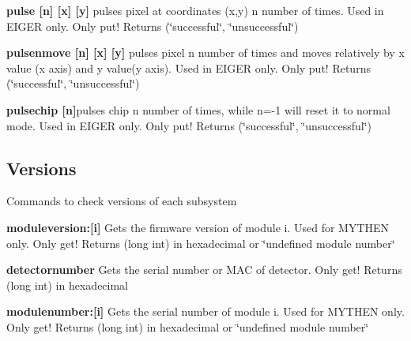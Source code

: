 \begin{DoxyItemize}
\item {\bfseries pulse \mbox{[}n\mbox{]} \mbox{[}x\mbox{]} \mbox{[}y\mbox{]}} pulses pixel at coordinates (x,y) n number of times. Used in EIGER only. Only put! {\ttfamily Returns} {\ttfamily }(\char`\"{}successful\char`\"{}, \char`\"{}unsuccessful\char`\"{})
\end{DoxyItemize}


\begin{DoxyItemize}
\item {\bfseries pulsenmove \mbox{[}n\mbox{]} \mbox{[}x\mbox{]} \mbox{[}y\mbox{]}} pulses pixel n number of times and moves relatively by x value (x axis) and y value(y axis). Used in EIGER only. Only put! {\ttfamily Returns} {\ttfamily }(\char`\"{}successful\char`\"{}, \char`\"{}unsuccessful\char`\"{})
\end{DoxyItemize}


\begin{DoxyItemize}
\item {\bfseries pulsechip \mbox{[}n\mbox{]}}pulses chip n number of times, while n=-\/1 will reset it to normal mode. Used in EIGER only. Only put! {\ttfamily Returns} {\ttfamily }(\char`\"{}successful\char`\"{}, \char`\"{}unsuccessful\char`\"{})
\end{DoxyItemize}\hypertarget{config_configversions}{}\subsection{Versions}\label{config_configversions}
Commands to check versions of each subsystem


\begin{DoxyItemize}
\item {\bfseries moduleversion:\mbox{[}i\mbox{]}} Gets the firmware version of module i. Used for MYTHEN only. Only get! {\ttfamily Returns} {\ttfamily }(long int) in hexadecimal or \char`\"{}undefined module number\char`\"{}
\end{DoxyItemize}


\begin{DoxyItemize}
\item {\bfseries detectornumber} Gets the serial number or MAC of detector. Only get! {\ttfamily Returns} {\ttfamily }(long int) in hexadecimal
\end{DoxyItemize}


\begin{DoxyItemize}
\item {\bfseries modulenumber:\mbox{[}i\mbox{]}} Gets the serial number of module i. Used for MYTHEN only. Only get! {\ttfamily Returns} {\ttfamily }(long int) in hexadecimal or \char`\"{}undefined module number\char`\"{}
\end{DoxyItemize}


